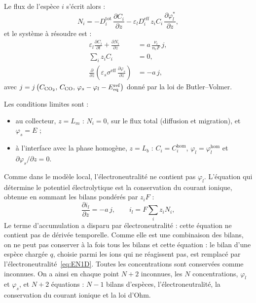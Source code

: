 Le flux de l'espèce $i$ s'écrit alors :
\begin{equation}
N_i = - D_i^{\mathrm{tot}}\,\frac{\partial C_i}{\partial z}
- \varepsilon_l D_i^{\mathrm{eff}}\, z_i C_i\,\frac{\partial \varphi_l^*}{\partial z},
\label{eq:flux1D}
\end{equation}
et le système à résoudre est :
\begin{align}
\varepsilon_l\frac{\partial C_i}{\partial t} + \frac{\partial N_i}{\partial z}
&= a\,\frac{\nu_i}{n_eF}\,j,
\label{eq:bilan1D}\\
\sum_i z_i C_i &= 0,
\label{eq:EN1D}\\
\frac{\partial}{\partial z}\left(\varepsilon_s\sigma^{\mathrm{eff}}\,
\frac{\partial \varphi_s}{\partial z}\right) &= -a\,j,
\label{eq:ohm1D}
\end{align}
avec $j = j\left(C_{\ce{CO2}},\, C_{\ce{CO}},\,
\varphi_s - \varphi_l - E_{\mathrm{eq}}^{\mathrm{ref}}\right)$ donné par la
loi de Butler--Volmer.

Les conditions limites sont :
\begin{itemize}
    \item au collecteur, $z = L_m$ : $N_i = 0$, sur le flux total (diffusion
    et migration), et $\varphi_s = E$ ;
    \item à l'interface avec la phase homogène, $z = L_b$ :
    $C_i = C_i^{\mathrm{hom}}$, $\varphi_l = \varphi_l^{\mathrm{hom}}$ et
    $\partial\varphi_s/\partial z = 0$.
\end{itemize}

Comme dans le modèle local, l'électroneutralité ne contient pas
$\varphi_l$. L'équation qui détermine le potentiel électrolytique est la
conservation du courant ionique, obtenue en sommant les bilans pondérés par
$z_iF$ :
\begin{equation}
\frac{\partial i_l}{\partial z} = -a\,j,
\qquad i_l = F\sum_i z_i N_i ,
\label{eq:charge1D}
\end{equation}
Le terme d'accumulation a disparu par électroneutralité : cette équation ne
contient pas de dérivée temporelle. Comme elle est une combinaison des bilans,
on ne peut pas conserver à la fois tous les bilans et cette équation : le
bilan d'une espèce chargée $q$, choisie parmi les ions qui ne réagissent pas,
est remplacé par l'électroneutralité~\eqref{eq:EN1D}. Toutes les
concentrations sont conservées comme inconnues. On a ainsi en chaque point
$N+2$ inconnues, les $N$ concentrations, $\varphi_l$ et $\varphi_s$, et
$N+2$ équations : $N-1$ bilans d'espèces, l'électroneutralité, la
conservation du courant ionique et la loi d'Ohm.

